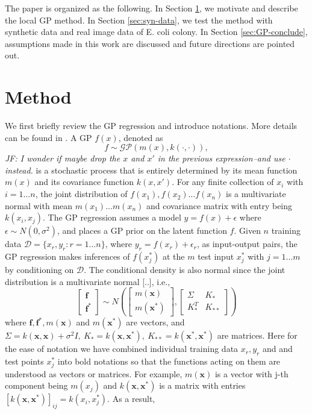 \documentclass[smallextended,natbib]{svjour3}       %
\begin{document}
The paper is organized as the following. In Section \ref{sec:GP-method}, we motivate and describe the local GP method. In Section \ref{sec:syn-data}, we test the method with synthetic data and real image data of E. coli colony. In Section \ref{sec:GP-conclude}, assumptions made in this work are discussed and future directions are pointed out.

\section{Method} \label{sec:GP-method}
We first briefly review the GP regression and introduce notations. More details can be found in \citep{Rasmussen2006}. A GP $f(x)$, denoted as $$f\sim\mathcal{GP}(m(x),k(\cdot,\cdot)),$$ \emph{JF: I wonder if maybe drop the $x$ and $x'$ in the previous expression--and use $\cdot$ instead.} is a stochastic process that is entirely determined by its mean function $m(x)$ and its covariance function $k(x,x')$. For any finite collection of $x_{i}$ with $i=1\ldots n$, the joint distribution of $f(x_{1}),f(x_{2})\ldots f(x_{n})$ is a multivariate normal with mean $m(x_{1})\ldots m(x_{n})$ and covariance matrix with entry being $k(x_{i},x_{j})$. The GP regression assumes a model $y=f(x)+\epsilon$ where $\epsilon\sim N(0,\sigma^{2})$, and places a GP prior on the latent function $f$. Given $n$ training data $\mathcal{D}=\{x_{r},y_{r}:r=1\ldots n\}$, where $y_{r}=f(x_{r})+\epsilon_{r}$, as input-output pairs, the GP regression makes inferences of $f(x_{j}^{*})$ at the $m$ test input $x_{j}^{*}$ with $j=1\ldots m$ by conditioning on $\mathcal{D}$. The conditional density is also normal since the joint distribution is a multivariate normal [..], i.e., 
\[
\begin{bmatrix}\mathbf{f}\\
\mathbf{f}^{*}
\end{bmatrix}\sim N(\begin{bmatrix}m(\mathbf{x})\\
m(\mathbf{x}^{*})
\end{bmatrix},\begin{bmatrix}\Sigma & K_{*}\\
K_{*}^{T} & K_{**}
\end{bmatrix})
\]
where $\mathbf{f},\mathbf{f}^{*},m(\mathbf{x})$ and $m(\mathbf{x}^{*})$ are vectors, and $\Sigma=k(\mathbf{x},\mathbf{x})+\sigma^{2}I,\ K_{*}=k(\mathbf{x},\mathbf{x}^{*}),\ K_{**}=k(\mathbf{x}^{*},\mathbf{x}^{*})$ are matrices. Here for the ease of notation we have combined individual training data $x_{r},y_{r}$ and and test points $x_{j}^{*}$ into bold notations so that the functions acting on them are understood as vectors or matrices. For example, $m(\mathbf{x})$ is a vector with j-th component being $m(x_{j})$ and $k(\mathbf{x},\mathbf{x}^{*})$ is a matrix with entries $[k(\mathbf{x},\mathbf{x}^{*})]_{ij}=k(x_{i},x_{j}^{*})$. As a result, 
\end{document}
